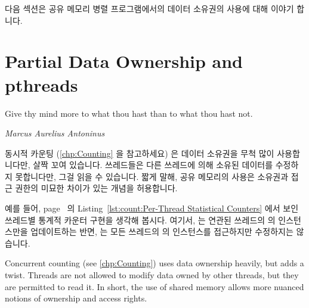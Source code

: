 다음 섹션은 공유 메모리 병렬 프로그램에서의 데이터 소유권의 사용에 대해 이야기
합니다.

\iffalse

This same pattern can be written in C as well as in \co{sh}, as illustrated by
Listings~\ref{lst:toolsoftrade:Using the fork() Primitive}
and~\ref{lst:toolsoftrade:Using the wait() Primitive}.

It bears repeating that these trivial forms of parallelism are not in
any way cheating or ducking responsibility, but are rather simple and
elegant ways to make your code run faster.
It is fast, scales well, is easy to program, easy to maintain, and
gets the job done.
In addition, taking this approach (where applicable) allows the developer
more time to focus on other things whether these things might involve
applying sophisticated single-threaded optimizations to \co{compute_it}
on the one hand, or applying sophisticated parallel-programming patterns
to portions of the code where this approach is inapplicable.
What is not to like?

The next section discusses the use of data ownership in shared-memory
parallel programs.

\fi

\section{Partial Data Ownership and pthreads}
\label{sec:owned:Partial Data Ownership and pthreads}
%
\epigraph{Give thy mind more to what thou hast than to what thou hast not.}
	 {\emph{Marcus Aurelius Antoninus}}

동시적 카운팅 (\cref{chp:Counting} 을 참고하세요) 은 데이터 소유권을 무척 많이
사용합니다만, 살짝 꼬여 있습니다.
쓰레드들은 다른 쓰레드에 의해 소유된 데이터를 수정하지 못합니다만, 그걸 읽을 수
있습니다.
짧게 말해, 공유 메모리의 사용은 소유권과 접근 권한의 미묘한 차이가 있는 개념을
허용합니다.

예를 들어,
page~\pageref{lst:count:Per-Thread Statistical Counters} 의
Listing~\ref{lst:count:Per-Thread Statistical Counters}
에서 보인 쓰레드별 통계적 카운터 구현을 생각해 봅시다.
여기서,  는 연관된 쓰레드의  의 인스턴스만을
업데이트하는 반면,  는 모든 쓰레드의  의
인스턴스를 접근하지만 수정하지는 않습니다.

\iffalse

Concurrent counting (see \cref{chp:Counting}) uses data ownership heavily,
but adds a twist.
Threads are not allowed to modify data owned by other threads,
but they are permitted to read it.
In short, the use of shared memory allows more nuanced notions
of ownership and access rights.

